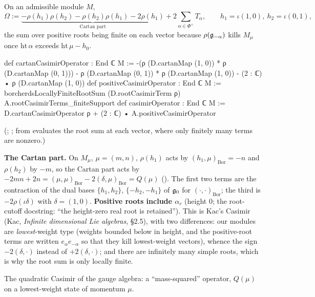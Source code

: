 \begin{definition}\label{ch18:def:casimir}
On an admissible module $M$,
\begin{equation*}
  \Omega:=\underbrace{-\rho(h_1)\rho(h_2)-\rho(h_2)\rho(h_1)-2\rho(h_1)}_{\text{Cartan part}}+2\sum_{\alpha\in\Phi^+}T_\alpha,\qquad
  h_1=\iota(1,0),\ h_2=\iota(0,1),
\end{equation*}
the sum over positive roots being finite on each vector because $\rho(\mathfrak{g}_{-\alpha})$ kills $M_\mu$ once $\mathrm{ht}\,\alpha$ exceeds
$\mathrm{ht}\,\mu-h_0$.
\end{definition}
\begin{leancode}
def cartanCasimirOperator : End ℂ M :=
  -(ρ (D.cartanMap (1, 0)) * ρ (D.cartanMap (0, 1))) -
    ρ (D.cartanMap (0, 1)) * ρ (D.cartanMap (1, 0)) -
      (2 : ℂ) • ρ (D.cartanMap (1, 0))
def positiveCasimirOperator : End ℂ M :=
  borcherdsLocallyFiniteRootSum (D.rootCasimirTerm ρ) A.rootCasimirTerms_finiteSupport
def casimirOperator : End ℂ M :=
  D.cartanCasimirOperator ρ + (2 : ℂ) • A.positiveCasimirOperator
\end{leancode}
(; ;
 from  evaluates the root
sum at each vector, where only finitely many terms are nonzero.)
\begin{dictionary}
\textbf{The Cartan part.}  On $M_\mu$, $\mu=(m,n)$, $\rho(h_1)$ acts by $(h_1,\mu)_{\mathrm{Bor}}=-n$ and $\rho(h_2)$ by $-m$, so the Cartan part
acts by $-2mn+2n=(\mu,\mu)_{\mathrm{Bor}}-2(\delta,\mu)_{\mathrm{Bor}}=Q(\mu)$ ().  The first two terms are the
contraction of the dual bases $\{h_1,h_2\}$, $\{-h_2,-h_1\}$ of $\mathfrak{g}_0$ for $(\cdot,\cdot)_{\mathrm{Bor}}$; the third is $-2\rho(\iota\delta)$ with
$\delta=(1,0)$.  \textbf{Positive roots include $\alpha_r$} (height $0$; the root-cutoff docstring: ``the height-zero real root
is retained'').  This is Kac's Casimir (Kac, \emph{Infinite dimensional Lie algebras}, §2.5), with two differences: our modules
are \emph{lowest}-weight type (weights bounded below in height, and the positive-root terms are written $e_\alpha e_{-\alpha}$ so that
they kill lowest-weight vectors), whence the sign $-2(\delta,\cdot)$ instead of $+2(\delta,\cdot)$; and there are infinitely many simple
roots, which is why the root sum is only locally finite.
\end{dictionary}
\begin{physics}
The quadratic Casimir of the gauge algebra: a ``mass-squared'' operator, $Q(\mu)$ on a lowest-weight state of momentum $\mu$.
\end{physics}

